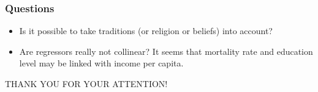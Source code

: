 \documentclass{beamer} %
\begin{document}
\begin{frame}
\frametitle{Questions}
\begin{itemize}
\item Is it possible to take traditions (or religion or beliefs) into account? 
\item Are regressors really not collinear?  It seems that mortality rate and education level may be linked with income per capita.
\end{itemize}
\end{frame}




\begin{frame}%
\begin{center}
THANK YOU FOR YOUR ATTENTION!
\vspace{1cm}
\end{center}
\end{frame}
\end{document}
